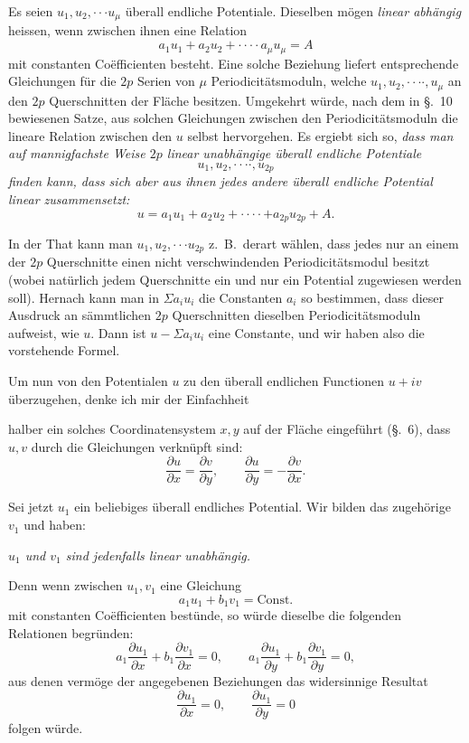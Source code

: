\documentclass{article}
\begin{document}
Es seien $u_{1}, u_{2}, \cdot\cdot\cdot u_{\mu}$ überall endliche Potentiale. Dieselben mögen \emph{linear abhängig} heissen, wenn zwischen ihnen eine Relation
\[ a_{1}u_{1} + a_{2}u_{2} + \cdot\cdot\cdot\cdot a_{\mu}u_{\mu} = A \]
mit constanten Coëfficienten besteht. Eine solche Beziehung liefert entsprechende Gleichungen für die $2p$ Serien von $\mu$ Periodicitätsmoduln, welche $u_{1}, u_{2}, \cdot\cdot\cdot\cdot, u_{\mu}$ an den $2p$ Querschnitten der Fläche besitzen. Umgekehrt würde, nach dem in §.~10 bewiesenen Satze, aus solchen Gleichungen zwischen den Periodicitätsmoduln die lineare Relation zwischen den $u$ selbst hervorgehen. Es ergiebt sich so, \emph{dass man auf mannigfachste Weise $2p$ linear unabhängige überall endliche Potentiale}
\[ u_{1}, u_{2}, \cdot\cdot\cdot\cdot, u_{2p} \]
\emph{finden kann, dass sich aber aus ihnen jedes andere überall endliche Potential linear zusammensetzt:}
\[ u = a_{1}u_{1} + a_{2}u_{2} + \cdot\cdot\cdot\cdot + a_{2p}u_{2p} + A. \]

In der That kann man $u_{1}, u_{2}, \cdot\cdot\cdot u_{2p}$ z.\ B.\ derart wählen, dass jedes nur an einem der $2p$ Querschnitte einen nicht verschwindenden Periodicitätsmodul besitzt (wobei natürlich jedem Querschnitte ein und nur ein Potential zugewiesen werden soll). Hernach kann man in $\Sigma a_{i}u_{i}$ die Constanten $a_{i}$ so bestimmen, dass dieser Ausdruck an sämmtlichen $2p$ Querschnitten dieselben Periodicitätsmoduln aufweist, wie $u$. Dann ist $u - \Sigma a_{i}u_{i}$ eine Constante, und wir haben also die vorstehende Formel.

Um nun von den Potentialen $u$ zu den überall endlichen Functionen $u + iv$ überzugehen, denke ich mir der Einfachheit

halber ein solches Coordinatensystem $x, y$ auf der Fläche eingeführt (§.~6), dass $u, v$ durch die Gleichungen verknüpft sind:
\[ \frac{\partial u}{\partial x} = \frac{\partial v}{\partial y}, \qquad \frac{\partial u}{\partial y} = - \frac{\partial v}{\partial x}. \]

Sei jetzt $u_{1}$ ein beliebiges überall endliches Potential. Wir bilden das zugehörige $v_{1}$ und haben:

\emph{$u_{1}$ und $v_{1}$ sind jedenfalls linear unabhängig.}

Denn wenn zwischen $u_{1}, v_{1}$ eine Gleichung
\[ a_{1}u_{1} + b_{1}v_{1} = \text{Const.} \]
mit constanten Coëfficienten bestünde, so würde dieselbe die folgenden Relationen begründen:
\[ a_{1}\frac{\partial u_{1}}{\partial x} + b_{1}\frac{\partial v_{1}}{\partial x} = 0, \qquad a_{1}\frac{\partial u_{1}}{\partial y} + b_{1}\frac{\partial v_{1}}{\partial y} = 0, \]
aus denen vermöge der angegebenen Beziehungen das widersinnige Resultat
\[ \frac{\partial u_{1}}{\partial x} = 0, \qquad \frac{\partial u_{1}}{\partial y} = 0 \]
folgen würde.
\end{document}
